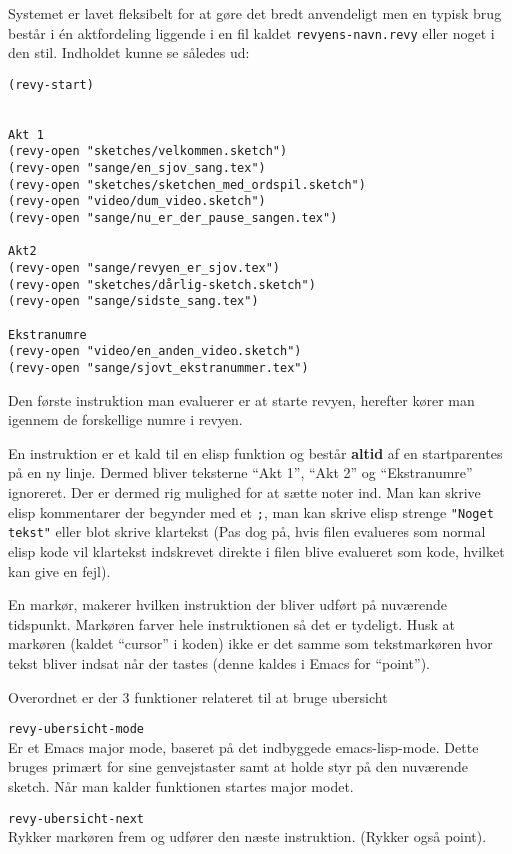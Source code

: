 \documentclass[10pt,a4paper,danish]{article}
\let\oldmarginnote\marginnote
\renewcommand{\marginnote}[1]{\oldmarginnote{\raggedright{}\footnotesize #1}}
\newcommand{\code}[1]{\colorbox{verbgray}{\texttt{#1}}}
\begin{document}
Systemet er lavet fleksibelt for at gøre det bredt anvendeligt men en typisk
brug består i én aktfordeling liggende i en fil kaldet \code{revyens-navn.revy}
eller noget i den stil. Indholdet kunne se således ud:

\begin{verbatim}
(revy-start)


Akt 1
(revy-open "sketches/velkommen.sketch")
(revy-open "sange/en_sjov_sang.tex")
(revy-open "sketches/sketchen_med_ordspil.sketch")
(revy-open "video/dum_video.sketch")
(revy-open "sange/nu_er_der_pause_sangen.tex")

Akt2
(revy-open "sange/revyen_er_sjov.tex")
(revy-open "sketches/dårlig-sketch.sketch")
(revy-open "sange/sidste_sang.tex")

Ekstranumre
(revy-open "video/en_anden_video.sketch")
(revy-open "sange/sjovt_ekstranummer.tex")
\end{verbatim}

Den første instruktion man evaluerer er at starte revyen, herefter kører man
igennem de forskellige numre i revyen.

En instruktion er et kald til en elisp funktion\marginnote{eller makro} og
består \textbf{altid} af en startparentes på en ny linje. Dermed bliver
teksterne ``Akt 1'', ``Akt 2'' og ``Ekstranumre'' ignoreret. Der er dermed rig
mulighed for at sætte noter ind. Man kan skrive elisp kommentarer der begynder
med et \code{;}, man kan skrive elisp strenge \code{"Noget
  tekst"} eller blot skrive klartekst (Pas dog på, hvis filen
evalueres som normal elisp kode vil klartekst indskrevet direkte i filen blive
evalueret som kode, hvilket kan give en fejl).\marginnote{Som i *-config.el}

En markør, makerer hvilken instruktion der bliver udført på nuværende tidspunkt.
Markøren farver hele instruktionen så det er tydeligt. Husk at markøren (kaldet
``cursor'' i koden) ikke er det samme som tekstmarkøren hvor tekst bliver indsat
når der tastes (denne kaldes i Emacs for ``point'').

Overordnet er der 3 funktioner relateret til at bruge ubersicht

\code{revy-ubersicht-mode}\\
Er et Emacs major mode, baseret på det indbyggede
emacs-lisp-mode. Dette bruges primært for sine genvejstaster samt at holde styr
på den nuværende sketch. Når man kalder funktionen startes major modet.

\code{revy-ubersicht-next}\\
Rykker markøren frem og udfører den næste instruktion. (Rykker også point).
\end{document}
